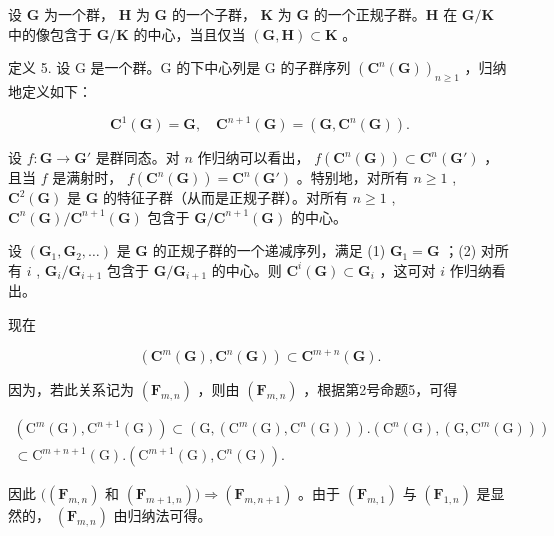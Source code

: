设 \(\mathbf{G}\) 为一个群， \(\mathbf{H}\) 为 \(\mathbf{G}\) 的一个子群， \(\mathbf{K}\) 为 \(\mathbf{G}\) 的一个正规子群。\(\mathbf{H}\) 在 \(\mathbf{G} / \mathbf{K}\) 中的像包含于 \(\mathbf{G} / \mathbf{K}\) 的中心，当且仅当 \((\mathbf{G}, \mathbf{H}) \subset \mathbf{K}\) 。

定义 5. 设 G 是一个群。G 的下中心列是 G 的子群序列 \((\mathbf{C}^n (\mathbf{G}))_{n\geqslant 1}\) ，归纳地定义如下：

\[
\mathbf {C} ^ {1} (\mathbf {G}) = \mathbf {G}, \quad \mathbf {C} ^ {n + 1} (\mathbf {G}) = (\mathbf {G}, \mathbf {C} ^ {n} (\mathbf {G})).
\]

设 \(f: \mathbf{G} \to \mathbf{G}'\) 是群同态。对 \(n\) 作归纳可以看出， \(f(\mathbf{C}^n(\mathbf{G})) \subset \mathbf{C}^n(\mathbf{G}')\) ，且当 \(f\) 是满射时， \(f(\mathbf{C}^n(\mathbf{G})) = \mathbf{C}^n(\mathbf{G}')\) 。特别地，对所有 \(n \geqslant 1\) , \(\mathbf{C}^2(\mathbf{G})\) 是 \(\mathbf{G}\) 的特征子群（从而是正规子群）。对所有 \(n \geqslant 1\) , \(\mathbf{C}^n(\mathbf{G}) / \mathbf{C}^{n+1}(\mathbf{G})\) 包含于 \(\mathbf{G} / \mathbf{C}^{n+1}(\mathbf{G})\) 的中心。

设 \((\mathbf{G}_1, \mathbf{G}_2, \ldots)\) 是 \(\mathbf{G}\) 的正规子群的一个递减序列，满足 (1) \(\mathbf{G}_1 = \mathbf{G}\) ；(2) 对所有 \(i\) , \(\mathbf{G}_i / \mathbf{G}_{i+1}\) 包含于 \(\mathbf{G} / \mathbf{G}_{i+1}\) 的中心。则 \(\mathbf{C}^i(\mathbf{G}) \subset \mathbf{G}_i\) ，这可对 \(i\) 作归纳看出。

现在

\[
\left(\mathbf {C} ^ {m} (\mathbf {G}), \mathbf {C} ^ {n} (\mathbf {G})\right) \subset \mathbf {C} ^ {m + n} (\mathbf {G}).\tag{7}
\]

因为，若此关系记为 \((\mathbf{F}_{m,n})\) ，则由 \((\mathbf{F}_{m,n})\) ，根据第2号命题5，可得

\[
\begin{array}{l} \left(\mathrm{C} ^ {m} (\mathrm{G}), \mathrm{C} ^ {n + 1} (\mathrm{G})\right) \subset \left(\mathrm{G}, \left(\mathrm{C} ^ {m} (\mathrm{G}), \mathrm{C} ^ {n} (\mathrm{G})\right)\right). \left(\mathrm{C} ^ {n} (\mathrm{G}), \left(\mathrm{G}, \mathrm{C} ^ {m} (\mathrm{G})\right)\right) \\ \subset \mathrm{C} ^ {m + n + 1} (\mathrm{G}). \left(\mathrm{C} ^ {m + 1} (\mathrm{G}), \mathrm{C} ^ {n} (\mathrm{G})\right). \end{array}
\]

因此 \(((\mathbf{F}_{m,n})\) 和 \((\mathbf{F}_{m + 1,n}))\Rightarrow (\mathbf{F}_{m,n + 1})\) 。由于 \((\mathbf{F}_{m,1})\) 与 \((\mathbf{F}_{1,n})\) 是显然的， \((\mathbf{F}_{m,n})\) 由归纳法可得。

